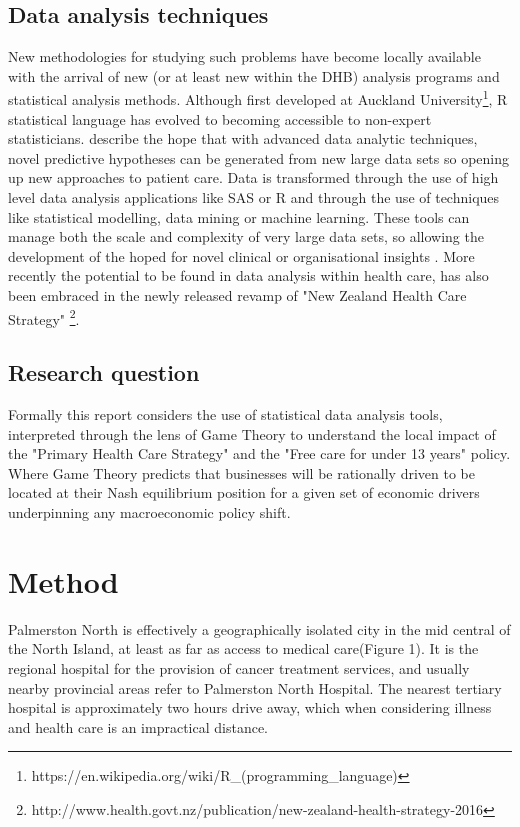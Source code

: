 \documentclass[11pt,a4paper]{article}
\begin{document}
\subsection{Data analysis techniques}
New methodologies for studying such problems have become locally available with the arrival of new (or at least new within the DHB) analysis programs and statistical analysis methods. Although first developed at Auckland University\footnote{https://en.wikipedia.org/wiki/R\_(programming\_language)}, R statistical language has evolved to becoming accessible to non-expert statisticians. \citet{khoury2014big}  describe the hope that with advanced data analytic techniques,  novel predictive hypotheses can be generated from new large data sets so opening up new approaches to patient care. Data is transformed through the use of high level data analysis applications like SAS or R and through the use of techniques like statistical modelling, data mining or machine learning. These tools can manage both the scale and complexity of very large data sets, so allowing the development of the hoped for novel clinical or organisational insights \citep{reshef2011detecting}.  More recently the potential to be found in data analysis within health care, has also been embraced in the newly released revamp of "New Zealand Health Care Strategy" \footnote{http://www.health.govt.nz/publication/new-zealand-health-strategy-2016}. \\

\subsection{Research question}
Formally this report considers the use of statistical data analysis tools, interpreted through the lens of Game Theory to understand the local impact of the "Primary Health Care Strategy" and the "Free care for under 13 years" policy. \\ 

Where Game Theory predicts that businesses will be rationally driven to be located at their Nash equilibrium position for a given set of economic drivers underpinning any macroeconomic policy shift. \\

\pagebreak
\section{Method}
Palmerston North is effectively a geographically isolated city in the mid central of the North Island, at least as far as access to medical care(Figure 1). It is the regional hospital for the provision of cancer treatment services, and usually nearby provincial areas refer to Palmerston North Hospital. The nearest tertiary hospital is approximately two hours drive away, which when considering illness and health care is an impractical distance.\\
\end{document}
